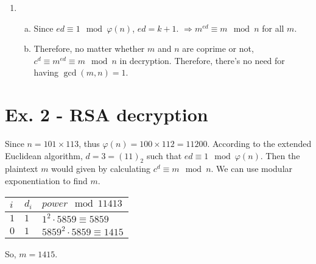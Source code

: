 \documentclass[a4paper,12pt]{journal}
\begin{document}
\begin{enumerate}
			\item \begin{enumerate}[a)]
				\item Since $ed \equiv 1 \mod \varphi(n)$, $ed = k + 1$. $\Rightarrow m^{ed} \equiv m \mod n$ for all $m$.
				
				\item Therefore, no matter whether $m$ and $n$ are coprime or not, $c^{d} \equiv m^{ed} \equiv m \mod n$ in decryption. Therefore,  there's no need for having $\gcd(m,n) = 1$.
			\end{enumerate}
		\end{enumerate}
		
		
		
		\section*{Ex. 2 - RSA decryption}
		\par Since $n = 101 \times 113$, thus $\varphi(n) = 100 \times 112 = 11200$. According to the extended Euclidean algorithm,  $d = 3 = (11)_{2}$ such that $ed \equiv 1 \mod \varphi(n)$. Then the plaintext $m$ would given by calculating $c^{d} \equiv m \mod n$. We can use modular exponentiation to find $m$.
		\begin{table}[!ht]
			\centering
			\begin{tabular}{l|l|l}
				$i$ & $d_{i}$ & $power \mod 11413$ \\
				\hline
				$1$ & $1$ & $1^{2} \cdot 5859 \equiv 5859$ \\
				$0$ & $1$ & $5859^{2} \cdot 5859 \equiv 1415$
			\end{tabular}
		\end{table}
		\par So, $m = 1415$.
		
		
		
\end{document}

